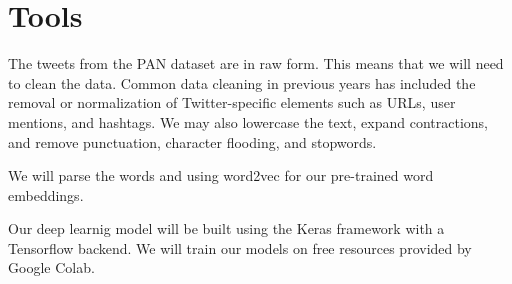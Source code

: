 \documentclass[11pt,a4paper]{article}
\begin{document}
\section{Tools}

The tweets from the PAN dataset are in raw form. This means that we will need to clean the data. Common data cleaning in previous years has included the removal or normalization of Twitter-specific elements such as URLs, user mentions, and hashtags. We may also lowercase the text, expand contractions, and remove punctuation, character flooding, and stopwords.

We will parse the words and using word2vec for our pre-trained word embeddings. 

Our deep learnig model will be built using the Keras framework with a Tensorflow backend. We will train our models on free resources provided by Google Colab. 



\footnotesize

\end{document}
